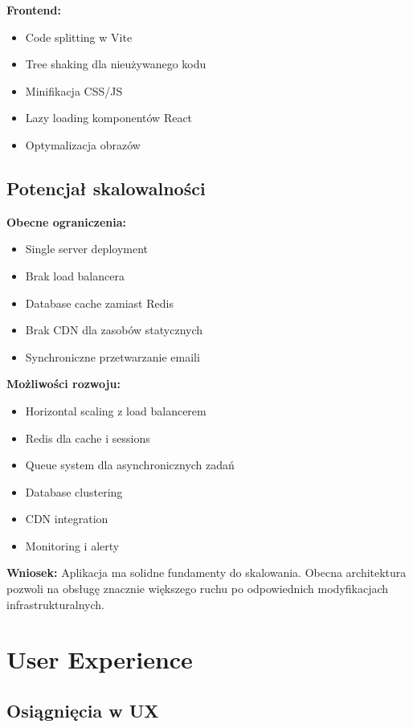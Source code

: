 \documentclass[12pt,a4paper]{article}
\begin{document}
    \textbf{Frontend:}
    \begin{itemize}
        \item Code splitting w Vite
        \item Tree shaking dla nieużywanego kodu
        \item Minifikacja CSS/JS
        \item Lazy loading komponentów React
        \item Optymalizacja obrazów
    \end{itemize}

    \subsection{Potencjał skalowalności}

    \textbf{Obecne ograniczenia:}
    \begin{itemize}
        \item Single server deployment
        \item Brak load balancera
        \item Database cache zamiast Redis
        \item Brak CDN dla zasobów statycznych
        \item Synchroniczne przetwarzanie emaili
    \end{itemize}

    \textbf{Możliwości rozwoju:}
    \begin{itemize}
        \item Horizontal scaling z load balancerem
        \item Redis dla cache i sessions
        \item Queue system dla asynchronicznych zadań
        \item Database clustering
        \item CDN integration
        \item Monitoring i alerty
    \end{itemize}

    \textbf{Wniosek:} Aplikacja ma solidne fundamenty do skalowania. Obecna architektura pozwoli na obsługę znacznie większego ruchu po odpowiednich modyfikacjach infrastrukturalnych.

    \section{User Experience}

    \subsection{Osiągnięcia w UX}
\end{document}
